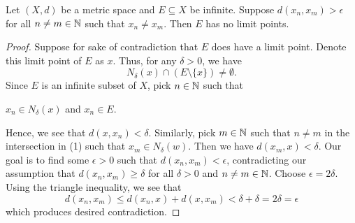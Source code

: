 \documentclass[a4paper]{article}
\begin{document}
\begin{lemma}[3]\label{lemma 3}
  Let \( (X,d) \) be a metric space and \( E \subseteq  X \) be infinite. Suppose \( d({x}_{n},{x}_{m}) > \epsilon  \) for all \( n \neq m  \in \mathbb{N}  \) such that \( {x}_{n} \neq {x}_{m} \). Then \( E  \) has no limit points.  
\end{lemma}
\begin{proof}
Suppose for sake of contradiction that \( E  \) does have a limit point. Denote this limit point of \( E  \) as \( x  \). Thus, for any \( \delta > 0  \), we have  
   \[  {N}_{\delta}(x) \cap (E \setminus  \{ x \} ) \neq \emptyset.  \tag{1} \]
   Since \( E  \) is an infinite subset of \( X  \), pick \( n \in \mathbb{N}  \) such that 
   \begin{center}
       \( {x}_{n} \in {N}_{\delta}(x)  \) and \( {x}_{n} \in E  \).
   \end{center}
   Hence, we see that \( d(x,{x}_{n}) < \delta \). Similarly, pick \( m \in \mathbb{N}   \) such that \( n \neq m  \) in the intersection in (1) such that \( {x}_{m} \in {N}_{\delta}(w) \). Then we have \( d({x}_{m},x) < \delta \). Our goal is to find some \( \epsilon > 0  \) such that \( d({x}_{n},{x}_{m}) < \epsilon  \), contradicting our assumption that \( d({x}_{n},{x}_{m}) \geq \delta \) for all \( \delta > 0 \) and \( n \neq m \in \mathbb{N} \). Choose \( \epsilon = 2 \delta \). Using the triangle inequality, we see that 
   \[  d({x}_{n},{x}_{m}) \leq d({x}_{n},x) + d(x,{x}_{m}) < \delta + \delta = 2 \delta = \epsilon \]
   which produces desired contradiction.
\end{proof}
\end{document}
